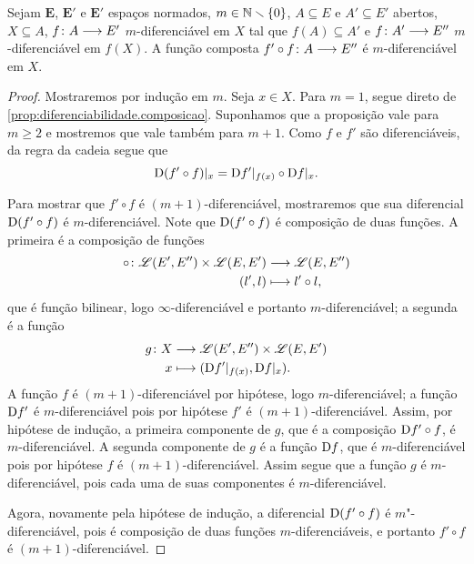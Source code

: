 \begin{proposition}
\label{prop:multidiferenciabilidade.composicao}
Sejam $\bm E$, $\bm E'$ e $\bm E'$ espaços normados, $m \in \mathbb{N} \smallsetminus \{0\}$, $A \subseteq E$ e $A' \subseteq E'$ abertos, $X \subseteq A$, $f\colon \allowbreak A \longrightarrow E'$ $m$-diferenciável em $X$ tal que $f(A) \subseteq A'$ e $f\colon \allowbreak A' \longrightarrow E''$ $m$-diferenciável em $f(X)$. A função composta $f' \circ f\colon \allowbreak A \longrightarrow E''$ é $m$-diferenciável em $X$.%
\end{proposition}
\begin{proof}
Mostraremos por indução em $m$. Seja $x \in X$. Para $m=1$, segue direto de \ref{prop:diferenciabilidade.composicao}. Suponhamos que a proposição vale para $m \geq 2$ e mostremos que vale também para $m+1$. Como $f$ e $f'$ são diferenciáveis, da regra da cadeia segue que
	\begin{equation*}
	\mathrm{D}(f' \circ f)|_x = \mathrm{D} f'|_{f(x)} \circ \mathrm{D} f|_x.
	\end{equation*}

Para mostrar que $f' \circ f$ é $(m+1)$-diferenciável, mostraremos que sua diferencial $\mathrm{D}(f' \circ f)$ é $m$-diferenciável. Note que $\mathrm{D}(f' \circ f)$ é composição de duas funções. A primeira é a composição de funções
	\begin{align*}
	{\circ}\colon {\mathscr{L}(E',E'') \times \mathscr{L}(E,E')} &\longrightarrow {\mathscr{L}(E,E'')} \\{(l',l)} &\longmapsto l' \circ l,
	\end{align*}
que é função bilinear, logo $\infty$-diferenciável e portanto $m$-diferenciável; a segunda é a função
	\begin{align*}
	{g}\colon {X} &\longrightarrow {\mathscr{L}(E',E'') \times \mathscr{L}(E,E')} \\{x} &\longmapsto (\mathrm{D} f'|_{f(x)}, \mathrm{D} f|_x).
	\end{align*}
A função $f$ é $(m+1)$-diferenciável por hipótese, logo $m$-diferenciável; a função $\mathrm{D} f'$ é $m$-diferenciável pois por hipótese $f'$ é $(m+1)$-diferenciável. Assim, por hipótese de indução, a primeira componente de $g$, que é a composição $\mathrm{D} f' \circ f$, é $m$-diferenciável. A segunda componente de $g$ é a função $\mathrm{D} f$, que é $m$-diferenciável pois por hipótese $f$ é $(m+1)$-diferenciável. Assim segue que a função $g$ é $m$-diferenciável, pois cada uma de suas componentes é $m$-diferenciável.

Agora, novamente pela hipótese de indução, a diferencial $\mathrm{D}(f' \circ f)$ é $m$"-diferenciável, pois é composição de duas funções $m$-diferenciáveis, e portanto $f' \circ f$ é $(m+1)$-diferenciável.
\end{proof}

